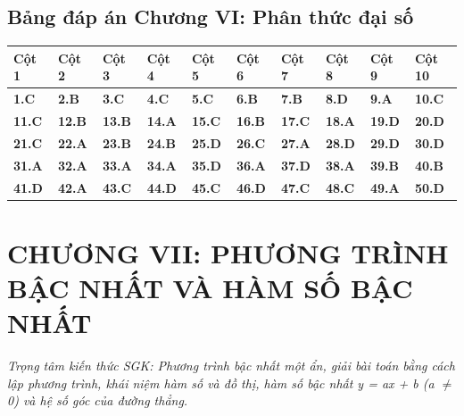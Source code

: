 \documentclass[11pt,a4paper]{article}
\begin{document}
\subsection*{\color{primary} Bảng đáp án Chương VI: Phân thức đại số}
\begin{center}
\renewcommand{\arraystretch}{1.25}
\begin{tabularx}{\textwidth}{*{10}{>{\centering\arraybackslash}X}}
\toprule
\textbf{\color{primary} Cột 1} & \textbf{\color{primary} Cột 2} & \textbf{\color{primary} Cột 3} & \textbf{\color{primary} Cột 4} & \textbf{\color{primary} Cột 5} & \textbf{\color{primary} Cột 6} & \textbf{\color{primary} Cột 7} & \textbf{\color{primary} Cột 8} & \textbf{\color{primary} Cột 9} & \textbf{\color{primary} Cột 10} \\
\midrule
\textbf{1.C} & \textbf{2.B} & \textbf{3.C} & \textbf{4.C} & \textbf{5.C} & \textbf{6.B} & \textbf{7.B} & \textbf{8.D} & \textbf{9.A} & \textbf{10.C} \\
\rowcolor{rowtint} \textbf{11.C} & \textbf{12.B} & \textbf{13.B} & \textbf{14.A} & \textbf{15.C} & \textbf{16.B} & \textbf{17.C} & \textbf{18.A} & \textbf{19.D} & \textbf{20.D} \\
\textbf{21.C} & \textbf{22.A} & \textbf{23.B} & \textbf{24.B} & \textbf{25.D} & \textbf{26.C} & \textbf{27.A} & \textbf{28.D} & \textbf{29.D} & \textbf{30.D} \\
\rowcolor{rowtint} \textbf{31.A} & \textbf{32.A} & \textbf{33.A} & \textbf{34.A} & \textbf{35.D} & \textbf{36.A} & \textbf{37.D} & \textbf{38.A} & \textbf{39.B} & \textbf{40.B} \\
\textbf{41.D} & \textbf{42.A} & \textbf{43.C} & \textbf{44.D} & \textbf{45.C} & \textbf{46.D} & \textbf{47.C} & \textbf{48.C} & \textbf{49.A} & \textbf{50.D} \\
\bottomrule
\end{tabularx}
\end{center}\vspace{10pt}
\section*{\color{primary} CHƯƠNG VII: PHƯƠNG TRÌNH BẬC NHẤT VÀ HÀM SỐ BẬC NHẤT}
\textit{Trọng tâm kiến thức SGK: Phương trình bậc nhất một ẩn, giải bài toán bằng cách lập phương trình, khái niệm hàm số và đồ thị, hàm số bậc nhất y = ax + b (a $\ne$ 0) và hệ số góc của đường thẳng.}\par\vspace{4pt}
\end{document}
